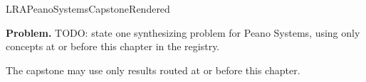 \ifcsname LRAPeanoSystemsCapstoneRendered\endcsname
\else
\expandafter\gdef\csname LRAPeanoSystemsCapstoneRendered\endcsname{}

\newpage
{}
\label{cap:peano-systems}

\begin{tcolorbox}[
  colback=gray!6,
  colframe=gray!40,
  arc=2pt,
  left=8pt, right=8pt, top=6pt, bottom=6pt,
  title={\small\textbf{Capstone Problem}},
  fonttitle=\small\bfseries
]
\textbf{Problem.}
TODO: state one synthesizing problem for Peano Systems, using only concepts at or
before this chapter in the registry.
\end{tcolorbox}

\begin{remark*}
The capstone may use only results routed at or before this chapter.
\end{remark*}

\clearpage
\fi
